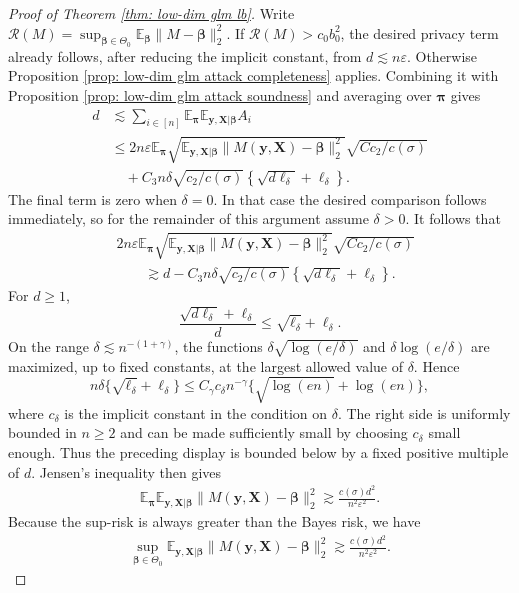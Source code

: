 \documentclass[letterpaper,12pt]{article}
\numberwithin{equation}{section}
\theoremstyle{plain}
\numberwithin{Theorem}{section}
\numberwithin{proposition}{section}
\numberwithin{Lemma}{section}
{
	\theoremstyle{definition}
	\newtheorem{Definition}{Definition}
	\newtheorem{example}{Example}
	\numberwithin{example}{section}
	\newtheorem{fact}{Fact}
	\numberwithin{fact}{section}
	\newtheorem{remark}{Remark}
}
\newcommand{\rev}[1]{#1}
\newcommand{\1}{\mathbbm{1}}
\def\bbeta{{\boldsymbol{\beta}}}
\def\E{\mathbb{E}}
\begin{document}
\begin{proof}[Proof of Theorem \ref{thm: low-dim glm lb}]
{	Write $\mathcal R(M)=\sup_{\bbeta\in\Theta_0}\E_{\bbeta}\|M-\bbeta\|_2^2$. If $\mathcal R(M)>c_0b_0^2$, the desired privacy term already follows, after reducing the implicit constant, from $d\lesssim n\varepsilon$. Otherwise Proposition \ref{prop: low-dim glm attack completeness} applies. Combining it with Proposition \ref{prop: low-dim glm attack soundness} and averaging over $\bm\pi$ gives}
	\begin{align*}
		d &\lesssim \sum_{i \in [n]}\E_{\bm \pi} \E_{\bm y, \bm X|\bbeta} A_i\\
		&\leq 2n\varepsilon\E_{\bm \pi}
		\sqrt{\E_{\bm y, \bm X|\bbeta} \|M(\bm y, \bm X) - \bbeta\|^2_2}
		\sqrt{Cc_2/c(\sigma)}\\
		&\quad + C_3n\delta\sqrt{c_2/c(\sigma)}
		\left\{\sqrt{d\ell_\delta}+\ell_\delta\right\}.
	\end{align*}
	The final term is zero when $\delta=0$. In that case the desired
	comparison follows immediately, so for the remainder of this argument
	assume $\delta>0$.
	It follows that
	\begin{align*}
		&2n\varepsilon\E_{\bm \pi}
		\sqrt{\E_{\bm y, \bm X|\bbeta} \|M(\bm y, \bm X) - \bbeta\|^2_2}
		\sqrt{Cc_2/c(\sigma)}\\
			&\qquad\gtrsim d - C_3n\delta\sqrt{c_2/c(\sigma)}
			\left\{\sqrt{d\ell_\delta}+\ell_\delta\right\}.
	\end{align*}
		For $d\geq1$,
		\[
			\frac{\sqrt{d\ell_\delta}+\ell_\delta}{d}
			\leq\sqrt{\ell_\delta}+\ell_\delta.
		\]
		On the range $\delta\lesssim n^{-(1+\gamma)}$, the functions
		$\delta\sqrt{\log(e/\delta)}$ and
		$\delta\log(e/\delta)$ are maximized, up to fixed constants, at the
		largest allowed value of $\delta$. Hence
		\[
			n\delta\{\sqrt{\ell_\delta}+\ell_\delta\}
			\leq C_\gamma c_\delta n^{-\gamma}
			\{\sqrt{\log(en)}+\log(en)\},
		\]
		where $c_\delta$ is the implicit constant in the condition on
		$\delta$. The right side is uniformly bounded in $n\geq2$ and can
		be made sufficiently small by choosing $c_\delta$ small enough.
		Thus the preceding display is bounded below by a fixed positive
		multiple of $d$. Jensen's inequality then gives
	\begin{align*}
		\E_{\bm \pi}\E_{\bm y, \bm X|\bbeta} \|M(\bm y, \bm X) - \bbeta\|^2_2 \gtrsim \frac{c(\sigma)d^2}{n^2\varepsilon^2}.
	\end{align*}
	Because the sup-risk is always greater than the Bayes risk, we have 
	\begin{align*}
		\rev{\sup_{\bbeta \in \Theta_0}}\E_{\bm y, \bm X|\bbeta} \|M(\bm y, \bm X) - \bbeta\|^2_2 \gtrsim \frac{c(\sigma)d^2}{n^2\varepsilon^2}.

\end{align*}
\end{proof}
\end{document}
